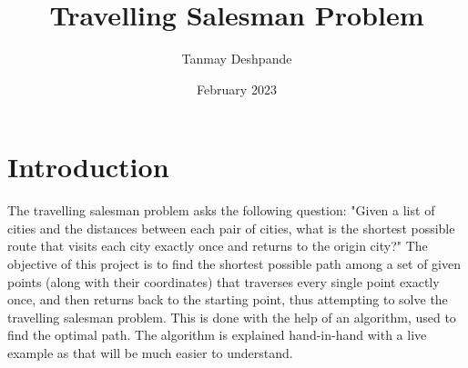 \documentclass{article}
\title{Travelling Salesman Problem}
\author{Tanmay Deshpande}
\date{February 2023}
\begin{document}
\pagecolor{base}
\color{text}
\maketitle

\section{Introduction}
The travelling salesman problem asks the following question:
"Given a list of cities and the distances between each pair of cities,
what is the shortest possible route that visits each city exactly once
and returns to the origin city?"
The objective of this project is to find the shortest possible path
among a set of given points (along with their coordinates) that
traverses every single point exactly once, and then returns back to the
starting point, thus attempting to solve the travelling salesman
problem.
This is done with the help of an algorithm, used to find the optimal
path. The algorithm is explained hand-in-hand with a live example as
that will be much easier to understand.
\end{document}
